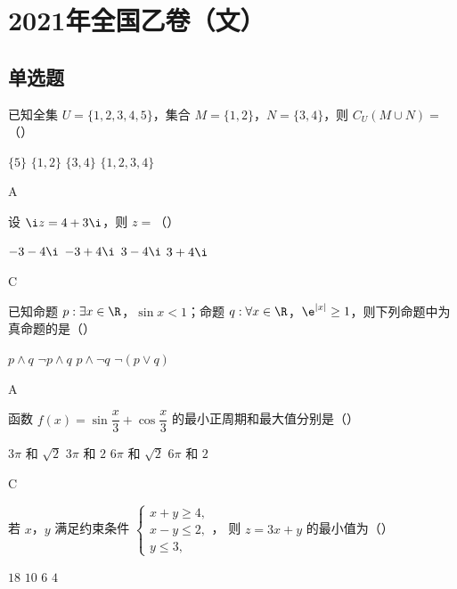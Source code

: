 \chapter{2021年全国乙卷（文）}

\section{单选题}

\begin{problem}
已知全集 \(U=\{1,2,3,4,5\}\)，集合 \(M=\{1,2\}\)，\(N=\{3,4\}\)，则 \(C_U\left(M\cup N\right)=\)（\quad）

\choices
    {\(\{5\}\)}
    {\(\{1,2\}\)}
    {\(\{3,4\}\)}
    {\(\{1,2,3,4\}\)}
\end{problem}

\begin{answer}
A
\end{answer}

\begin{problem}
设 \(\i z=4+3\i\)，则 \(z=\)（\quad）

\choices
    {\(-3-4\i\)}
    {\(-3+4\i\)}
    {\(3-4\i\)}
    {\(3+4\i\)}
\end{problem}

\begin{answer}
C
\end{answer}

\begin{problem}
已知命题 \(p:\exists x\in\R\)，\(\sin x<1\)；命题 \(q:\forall x\in\R\)，\(\e^{|x|}\ge1\)，则下列命题中为真命题的是（\quad）

\choices
    {\(p\wedge q\)}
    {\(\neg p\wedge q\)}
    {\(p\wedge \neg q\)}
    {\(\neg\left(p\vee q\right)\)}
\end{problem}

\begin{answer}
A
\end{answer}

\begin{problem}
函数 \(f(x)=\sin\dfrac{x}{3}+\cos\dfrac{x}{3}\) 的最小正周期和最大值分别是（\quad）

\choices
    {\(3\pi\) 和 \(\sqrt2\)}
    {\(3\pi\) 和 \(2\)}
    {\(6\pi\) 和 \(\sqrt2\)}
    {\(6\pi\) 和 \(2\)}
\end{problem}

\begin{answer}
C
\end{answer}

\begin{problem}
若 \(x\)，\(y\) 满足约束条件
\(\begin{cases}
x+y\ge4,\\
x-y\le2,\\
y\le3,
\end{cases}\)，
则 \(z=3x+y\) 的最小值为（\quad）

\choices
    {\(18\)}
    {\(10\)}
    {\(6\)}
    {\(4\)}
\end{problem}

